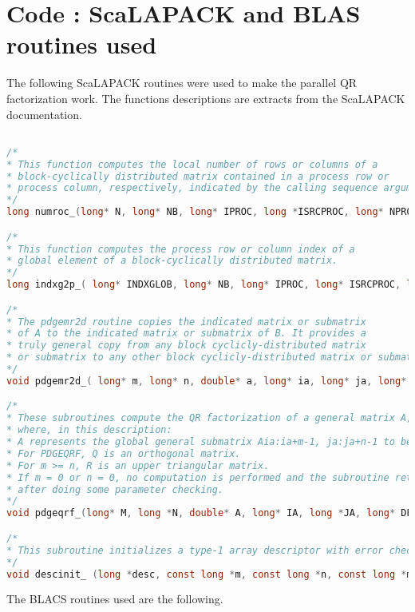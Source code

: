 \documentclass{article}
\begin{document}
\section{Code : ScaLAPACK and BLAS routines used}

The following ScaLAPACK routines were used to make the parallel QR factorization work. The functions descriptions are extracts from the ScaLAPACK documentation.

\begin{lstlisting}[language=c]

/*
* This function computes the local number of rows or columns of a 
* block-cyclically distributed matrix contained in a process row or 
* process column, respectively, indicated by the calling sequence argument iproc.
*/
long numroc_(long* N, long* NB, long* IPROC, long *ISRCPROC, long* NPROCS );

/*
* This function computes the process row or column index of a 
* global element of a block-cyclically distributed matrix.
*/
long indxg2p_( long* INDXGLOB, long* NB, long* IPROC, long* ISRCPROC, long* NPROCS  );

/*
* The pdgemr2d routine copies the indicated matrix or submatrix 
* of A to the indicated matrix or submatrix of B. It provides a 
* truly general copy from any block cyclicly-distributed matrix 
* or submatrix to any other block cyclicly-distributed matrix or submatrix.
*/
void pdgemr2d_( long* m, long* n, double* a, long* ia, long* ja, long* desca, double* b, long* ib, long* jb, long* descb, long* ictxt);

/*
* These subroutines compute the QR factorization of a general matrix A, 
* where, in this description:
* A represents the global general submatrix Aia:ia+m-1, ja:ja+n-1 to be factored.
* For PDGEQRF, Q is an orthogonal matrix.
* For m >= n, R is an upper triangular matrix.
* If m = 0 or n = 0, no computation is performed and the subroutine returns 
* after doing some parameter checking.
*/
void pdgeqrf_(long* M, long *N, double* A, long* IA, long *JA, long* DESCA, double *TAU, double *WORK, long* LWORK, long *INFO);

/* 
* This subroutine initializes a type-1 array descriptor with error checking 
*/
void descinit_ (long *desc, const long *m, const long *n, const long *mb, const long *nb, const long *irsrc, const long *icsrc, const long *ictxt, const long *lld, long *info);

\end{lstlisting}

The BLACS routines used are the following.
\end{document}
